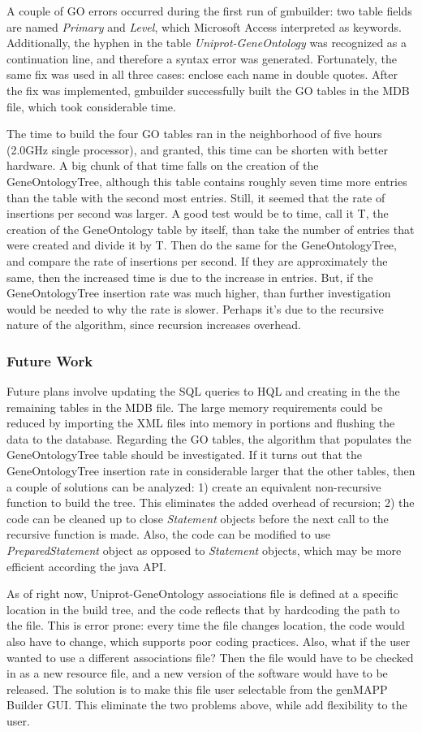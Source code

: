 A couple of GO errors occurred during the first run of gmbuilder: two table fields are named \emph{Primary} and \emph{Level}, which
Microsoft Access interpreted as keywords. Additionally, the hyphen in the table \emph{Uniprot-GeneOntology}
was recognized  as a continuation line, and therefore a syntax error was generated. Fortunately, the same fix was used
in all three cases: enclose each name in double quotes. After the fix was implemented, gmbuilder successfully built the
GO tables in the MDB file, which took considerable time.

The time to build the four GO tables ran in the neighborhood of five hours (2.0GHz single processor), and
granted, this time can be shorten with better hardware. A big chunk of that time falls on the creation of the
GeneOntologyTree, although this table contains roughly seven time more entries than the table with the second
most entries. Still, it seemed that the rate of insertions per second was larger.
A good test would be to time, call it T, the creation of the
GeneOntology table by itself, than take the number of entries that were created and divide it by T. Then do the same for the
GeneOntologyTree, and compare the rate of insertions per second. If they are approximately the same, then the increased time
is due to the increase in entries. But, if the GeneOntologyTree insertion rate was much higher, than further investigation would be
needed to why the rate is slower. Perhaps it's due to the recursive nature of the algorithm, since recursion increases overhead.


\subsubsection{Future Work}
Future plans involve updating the SQL queries to HQL and creating in the the remaining tables in the MDB file. The large memory requirements could be reduced by importing the XML files into memory in portions and flushing the data to the database. Regarding the GO tables, the algorithm that populates the GeneOntologyTree table should be investigated.
If it turns out that the GeneOntologyTree insertion rate in considerable larger that the other tables, then
a couple of solutions can be analyzed: 1) create an equivalent non-recursive function to build the tree. This
eliminates the added overhead of recursion; 2) the code can be cleaned up to
close \emph{Statement} objects before the next call to the recursive function is made. Also, the code can
be modified to use \emph{PreparedStatement} object as opposed to \emph{Statement} objects, which may be more
efficient according the java API.


As of right now, Uniprot-GeneOntology associations file is defined at a specific location in the build tree,
and the code reflects that by hardcoding the path to the file. This is error prone: every time the file changes location,
the code would also have to change, which supports poor coding practices. Also, what if the user wanted to use a different
associations file? Then the file would have to be checked in as a new resource file, and a new version of the software would have
to be released. The solution is to make this file user selectable from the genMAPP Builder GUI. This eliminate the two problems
above, while add flexibility to the user.
